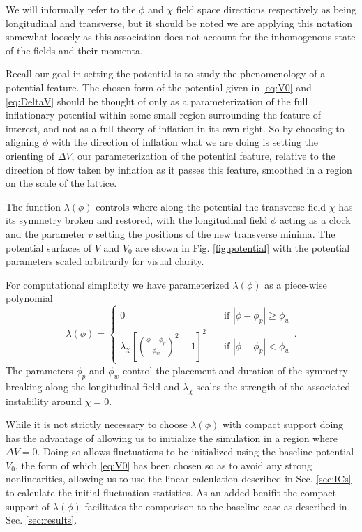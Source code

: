 We will informally refer to the $\phi$ and $\chi$ field space directions respectively as being longitudinal and transverse, but it should be noted we are applying this notation somewhat loosely as this association does not account for the inhomogenous state of the fields and their momenta.

Recall our goal in setting the potential is to study the phenomenology of a potential feature. The chosen form of the potential given in \eqref{eq:V0} and \eqref{eq:DeltaV} should be thought of only as a parameterization of the full inflationary potential within some small region surrounding the feature of interest, and not as a full theory of inflation in its own right. So by choosing to aligning $\phi$ with the direction of inflation what we are doing is setting the orienting of $\Delta V$, our parameterization of the potential feature, relative to the direction of flow taken by inflation as it passes this feature, smoothed in a region on the scale of the lattice.

The function $\lambda(\phi)$ controls where along the potential the transverse field $\chi$ has its symmetry broken and restored, with the longitudinal field $\phi$ acting as a clock and the parameter $v$ setting the positions of the new transverse minima. The potential surfaces of $V$ and $V_0$ are shown in Fig. \ref{fig:potential} with the potential parameters scaled arbitrarily for visual clarity.

For computational simplicity we have parameterized $\lambda(\phi)$ as a piece-wise polynomial
\begin{equation} \label{eq:lambda}
  \lambda(\phi) =
  \begin{cases}
    0 & \quad \text{if } |\phi-\phi_p|\ge\phi_w \\
    \lambda_\chi\left[\left(\frac{\phi-\phi_p}{\phi_w}\right)^2 - 1 \right]^2 & \quad \text{if  } |\phi-\phi_p|<\phi_w
  \end{cases}.
\end{equation}
The parameters $\phi_p$ and $\phi_w$ control the placement and duration of the symmetry breaking along the longitudinal field and $\lambda_\chi$ scales the strength of the associated instability around $\chi=0$.

While it is not strictly necessary to choose $\lambda(\phi)$ with compact support doing has the advantage of allowing us to initialize the simulation in a region where $\Delta V=0$. Doing so allows fluctuations to be initialized using the baseline potential $V_0$, the form of which \eqref{eq:V0} has been chosen so as to avoid any strong nonlinearities, allowing us to use the linear calculation described in Sec. \ref{sec:ICs} to calculate the initial fluctuation statistics. As an added benifit the compact support of $\lambda(\phi)$ facilitates the comparison to the baseline case as described in Sec. \ref{sec:results}.

